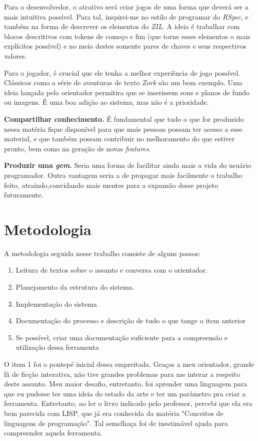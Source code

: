 Para o desenvolvedor, o atrativo será criar jogos de uma forma que deverá ser a
mais intuitiva possível. Para tal, inspirei-me no estilo de programar do
\emph{RSpec}, e também na forma de descrever os elementos do \emph{ZIL}. A ideia
é trabalhar com blocos descritivos com tokens de começo e fim (que torne esses
elementos o mais explícitos possível) e no meio destes somente pares de chaves e
seus respectivos valores.

Para o jogador, é crucial que ele tenha a melhor experiência de jogo possível.
Clássicos como a série de aventuras de texto \emph{Zork} \citep{Zork} são um bom
exemplo. Uma ideia lançada pelo orientador permitira que se inserissem sons e
planos de fundo ou imagens. É uma boa adição ao sistema, mas não é a prioridade.

\textbf{Compartilhar conhecimento.} É fundamental que tudo o que for produzido
nessa matéria fique disponível para que mais pessoas possam ter acesso a esse
material, e que também possam contribuir no melhoramento do que estiver pronto,
bem como na geração de novas \emph{features}.

\textbf{Produzir uma \emph{gem}.} Seria uma forma de facilitar ainda mais a vida
do usuário programador. Outra vantagem seria a de propagar mais facilmente o
trabalho feito, atraindo,convidando mais mentes para a expansão desse projeto
futuramente.

\section{Metodologia}
\label{sec:methodology}

A metodologia seguida nesse trabalho consiste de alguns passos:
\begin{enumerate}
    \item Leitura de textos sobre o assunto e conversa com o orientador.
    \item Planejamento da estrutura do sistema.
    \item Implementação do sistema
    \item Documentação do processo e descrição de tudo o que tange o item anterior
    \item Se possível, criar uma documentação suficiente para a compreensão e
    utilização dessa ferramenta
\end{enumerate}

O item 1 foi o pontepé inicial dessa empreitada. Graças a meu orientador, grande
fã de ficção interativa, não tive grandes problemas para me interar a respeito
deste assunto. Meu maior desafio, entretanto, foi aprender uma linguagem para
que eu pudesse ter uma ideia do estado da arte e ter um parâmetro pra criar a
ferramenta. Entretanto, ao ler o livro \citet{Zil:95} indicado pelo professor,
percebi que ela era bem parecida com LISP, que já era conhecida da matéria
"Conceitos de linguagens de programação". Tal semelhaça foi de inestimável ajuda
para compreender aquela ferramenta.

